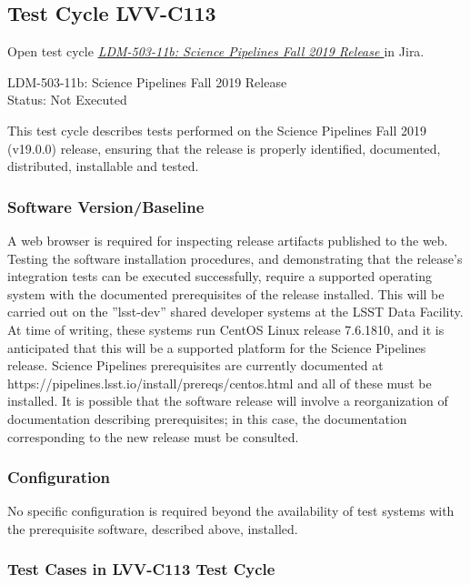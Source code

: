 \documentclass[DM,lsstdraft,STR,toc]{lsstdoc}
\begin{document}
  \subsection{Test Cycle LVV-C113 }

Open test cycle {\it \href{https://jira.lsstcorp.org/secure/Tests.jspa#/testrun/LVV-C113}{LDM-503-11b: Science Pipelines Fall 2019 Release
}} in Jira.

  LDM-503-11b: Science Pipelines Fall 2019 Release
\\
  Status: Not Executed

  This test cycle describes tests performed on the Science Pipelines Fall
2019 (v19.0.0) release, ensuring that the release is properly
identified, documented, distributed, installable and tested.


  \subsubsection{Software Version/Baseline}
    A web browser is required for inspecting release artifacts published to
the web.\\[2\baselineskip]Testing the software installation procedures,
and demonstrating that the release's integration tests can be executed
successfully, require a supported operating system with the documented
prerequisites of the release installed. This will be carried out on the
''lsst-dev'' shared developer systems at the LSST Data Facility. At time
of writing, these systems run CentOS Linux release 7.6.1810, and it is
anticipated that this will be a supported platform for the Science
Pipelines release. Science Pipelines prerequisites are currently
documented at https://pipelines.lsst.io/install/prereqs/centos.html and
all of these must be installed. It is possible that the software release
will involve a reorganization of documentation describing prerequisites;
in this case, the documentation corresponding to the new release must be
consulted.


  \subsubsection{Configuration}
    No specific configuration is required beyond the availability of test
systems with the prerequisite software, described above, installed.


  \subsubsection{Test Cases in LVV-C113 Test Cycle}
\end{document}
